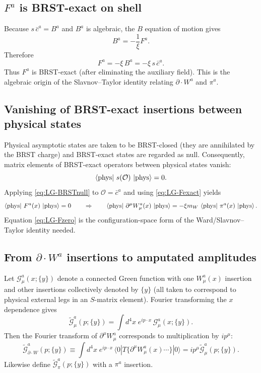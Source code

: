 \documentclass[11pt]{article}
\theoremstyle{remark}
\begin{document}
\subsection{$F^a$ is BRST-exact on shell}
Because $s\,\bar c^a = B^a$ and $B^a$ is algebraic, the $B$ equation of motion gives
\begin{equation}\label{eq:LG-BEOM}
B^a = -\frac{1}{\xi}F^a.
\end{equation}
Therefore
\begin{equation}\label{eq:LG-Fexact}
F^a = -\xi\,B^a = -\xi\,s\,\bar c^a.
\end{equation}
Thus $F^a$ is BRST-exact (after eliminating the auxiliary field). This is the algebraic origin of the
Slavnov--Taylor identity relating $\partial\!\cdot\!W^a$ and $\pi^a$.

\subsection{Vanishing of BRST-exact insertions between physical states}
Physical asymptotic states are taken to be BRST-closed (they are annihilated by the BRST charge)
and BRST-exact states are regarded as null. Consequently, matrix elements of BRST-exact operators
between physical states vanish:
\begin{equation}\label{eq:LG-BRSTnull}
\bra{\mathrm{phys}}\,s(\mathcal{O})\,\ket{\mathrm{phys}}=0.
\end{equation}
Applying \eqref{eq:LG-BRSTnull} to $\mathcal{O}=\bar c^a$ and using \eqref{eq:LG-Fexact} yields
\begin{equation}\label{eq:LG-Fzero}
\bra{\mathrm{phys}}\,F^a(x)\,\ket{\mathrm{phys}}=0
\qquad\Rightarrow\qquad
\bra{\mathrm{phys}}\,\partial^\mu W_\mu^a(x)\,\ket{\mathrm{phys}}
=
-\xi m_W\,\bra{\mathrm{phys}}\,\pi^a(x)\,\ket{\mathrm{phys}}.
\end{equation}
Equation \eqref{eq:LG-Fzero} is the configuration-space form of the Ward/Slavnov--Taylor identity needed.

\subsection{From \texorpdfstring{$\partial\!\cdot\!W^a$}{div W} insertions to amputated amplitudes}
Let $\mathcal{G}^{a}_{\mu}(x;\{y\})$ denote a connected Green function with one $W^a_\mu(x)$ insertion and
other insertions collectively denoted by $\{y\}$ (all taken to correspond to physical external legs in
an $S$-matrix element). Fourier transforming the $x$ dependence gives
\begin{equation}
\widetilde{\mathcal{G}}^{a}_{\mu}(p;\{y\})=\int d^4x\;e^{ip\cdot x}\,\mathcal{G}^{a}_{\mu}(x;\{y\}).
\end{equation}
Then the Fourier transform of $\partial^\mu W_\mu^a$ corresponds to multiplication by $i p^\mu$:
\begin{equation}
\widetilde{\mathcal{G}}^{a}_{\partial\cdot W}(p;\{y\}) \equiv
\int d^4x\;e^{ip\cdot x}\,\langle 0|T\{\partial^\mu W_\mu^a(x)\cdots\}|0\rangle
= i p^\mu \widetilde{\mathcal{G}}^{a}_{\mu}(p;\{y\}).
\end{equation}
Likewise define $\widetilde{\mathcal{G}}^{a}_{\pi}(p;\{y\})$ with a $\pi^a$ insertion.
\end{document}
